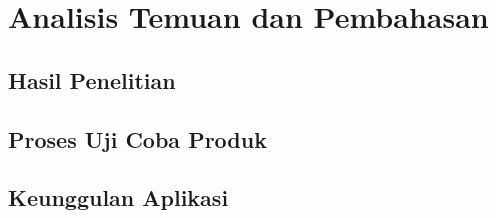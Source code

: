 \chapter{Analisis Temuan dan Pembahasan} %
\section{Hasil Penelitian}
\section{Proses Uji Coba Produk}
\section{Keunggulan Aplikasi}
